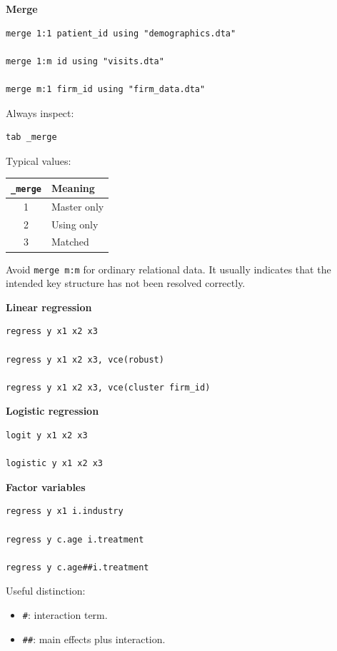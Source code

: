\documentclass[11pt,letterpaper]{article}
\begin{document}
\textbf{Merge}

\begin{lstlisting}
merge 1:1 patient_id using "demographics.dta"

merge 1:m id using "visits.dta"

merge m:1 firm_id using "firm_data.dta"
\end{lstlisting}

Always inspect:

\begin{lstlisting}
tab _merge
\end{lstlisting}

Typical values:

\begin{center}
\begin{tabular}{cl}
\toprule
\texttt{\_merge} & Meaning \\
\midrule
1 & Master only \\
2 & Using only \\
3 & Matched \\
\bottomrule
\end{tabular}
\end{center}

Avoid \texttt{merge m:m} for ordinary relational data. It usually indicates
that the intended key structure has not been resolved correctly.

\textbf{Linear regression}

\begin{lstlisting}
regress y x1 x2 x3

regress y x1 x2 x3, vce(robust)

regress y x1 x2 x3, vce(cluster firm_id)
\end{lstlisting}

\textbf{Logistic regression}

\begin{lstlisting}
logit y x1 x2 x3

logistic y x1 x2 x3
\end{lstlisting}

\textbf{Factor variables}

\begin{lstlisting}
regress y x1 i.industry

regress y c.age i.treatment

regress y c.age##i.treatment
\end{lstlisting}

Useful distinction:

\begin{itemize}[leftmargin=*]
    \item \texttt{\#}: interaction term.
    \item \texttt{\#\#}: main effects plus interaction.
\end{itemize}
\end{document}
